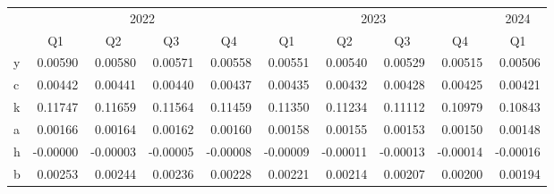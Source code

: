 \setlength{\parindent}{6pt}
\setlength{\tabcolsep}{4pt}
\begin{tabular}{@{}lrrrrrrrrr@{}}%
\toprule%
 & \multicolumn{4}{c}{2022} & \multicolumn{4}{c}{2023} & \multicolumn{1}{c}{2024}\\
 & \multicolumn{1}{c}{Q1} & \multicolumn{1}{c}{Q2} & \multicolumn{1}{c}{Q3} & \multicolumn{1}{c}{Q4} & \multicolumn{1}{c}{Q1} & \multicolumn{1}{c}{Q2} & \multicolumn{1}{c}{Q3} & \multicolumn{1}{c}{Q4} & \multicolumn{1}{c}{Q1}\\[-2pt]%
\hline%
%
\rowcolor{white}\noindent y&0.00590&0.00580&0.00571&0.00558&0.00551&0.00540&0.00529&0.00515&0.00506\\%
\rowcolor{white}\noindent c&0.00442&0.00441&0.00440&0.00437&0.00435&0.00432&0.00428&0.00425&0.00421\\%
\rowcolor{white}\noindent k&0.11747&0.11659&0.11564&0.11459&0.11350&0.11234&0.11112&0.10979&0.10843\\%
\rowcolor{white}\noindent a&0.00166&0.00164&0.00162&0.00160&0.00158&0.00155&0.00153&0.00150&0.00148\\%
\rowcolor{white}\noindent h&-0.00000&-0.00003&-0.00005&-0.00008&-0.00009&-0.00011&-0.00013&-0.00014&-0.00016\\%
\rowcolor{white}\noindent b&0.00253&0.00244&0.00236&0.00228&0.00221&0.00214&0.00207&0.00200&0.00194\\%
\bottomrule
\end{tabular}\setlength{\parindent}{0pt}
 \par \medskip

